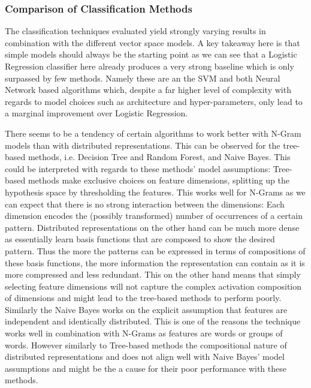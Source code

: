\subsubsection{Comparison of Classification Methods}
\label{subs:Classification Methods}

The classification techniques evaluated yield strongly varying results in combination with the different vector space models. A key takeaway here is that simple models should always be the starting point as we can see that a Logistic Regression classifier here already produces a very strong baseline which is only surpassed by few methods. Namely these are an the SVM and both Neural Network based algorithms which, despite a far higher level of complexity with regards to model choices such as architecture and hyper-parameters, only lead to a marginal improvement over Logistic Regression.

There seems to be a tendency of certain algorithms to work better with N-Gram models than with distributed representations. This can be observed for the tree-based methods, i.e. Decision Tree and Random Forest, and Naive Bayes. This could be interpreted with regards to these methods' model assumptions: Tree-based methods make exclusive choices on feature dimensions, splitting up the hypothesis space by thresholding the features. This works well for N-Grams as we can expect that there is no strong interaction between the dimensions: Each dimension encodes the (possibly transformed) number of occurrences of a certain pattern. Distributed representations on the other hand can be much more dense as essentially learn basis functions that are composed to show the desired pattern.
Thus the more the patterns can be expressed in terms of compositions of these basis functions, the more information the representation can contain as it is more compressed and less redundant. This on the other hand means that simply selecting feature dimensions will not capture the complex activation composition of dimensions and might lead to the tree-based methods to perform poorly. Similarly the Naive Bayes works on the explicit assumption that features are independent and identically distributed. This is one of the reasons the technique works well in combination with N-Grams as features are words or groups of words. However similarly to Tree-based methods the compositional nature of distributed representations and does not align well with Naive Bayes' model assumptions and might be the a cause for their poor performance with these methods.

